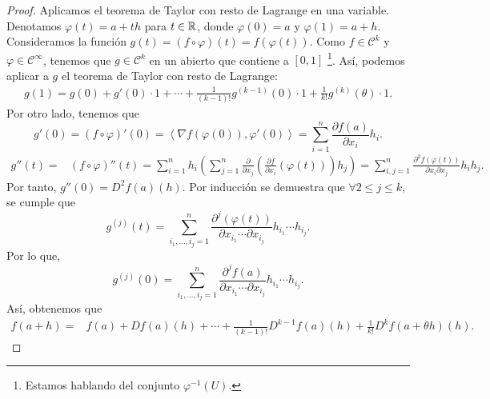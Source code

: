 \begin{proof}
Aplicamos el teorema de Taylor con resto de Lagrange en una variable. Denotamos $\displaystyle \varphi\left(t\right)= a + th $ para $\displaystyle t \in \mathbb{R} $, donde $\displaystyle \varphi\left(0\right) = a $ y $\displaystyle \varphi\left(1\right) = a+h $. Consideramos la función $\displaystyle g\left(t\right)=\left(f\circ \varphi\right)\left(t\right) = f\left(\varphi\left(t\right)\right) $. 
Como $\displaystyle f \in \mathcal{C}^{k} $ y $\displaystyle \varphi \in \mathcal{C}^{\infty} $, tenemos que $\displaystyle g \in \mathcal{C}^{k} $ en un abierto que contiene a $\displaystyle \left[0,1\right]  $ \footnote{Estamos hablando del conjunto $\displaystyle \varphi^{-1}\left(U\right) $.}. Así, podemos aplicar a $\displaystyle g $ el teorema de Taylor con resto de Lagrange:
\[
\begin{split}
	g\left(1\right) = g\left(0\right) + g'\left(0\right) \cdot 1 + \cdots + \frac{1}{\left(k-1\right)!}g^{ \left(k-1\right)}\left(0\right) \cdot 1 + \frac{1}{k!}g^{\left(k\right)}\left(\theta \right) \cdot 1.
\end{split}
\]
Por otro lado, tenemos que
\[g'\left(0\right) = \left(f\circ\varphi\right)'\left(0\right) = \left\langle \nabla f\left(\varphi\left(0\right)\right), \varphi'\left(0\right) \right\rangle = \sum^{n}_{i = 1}\frac{\partial f\left(a\right)}{\partial x_{i}}h_{i} .\]
\[
\begin{split}
	g''\left(t\right)= & \left(f\circ\varphi\right)''\left(t\right) = \sum^{n}_{i = 1}h_{i}\left(\sum^{n}_{j = 1}\frac{\partial }{\partial x_{j}}\left(\frac{\partial f}{\partial x_{i}}\left(\varphi\left(t\right)\right)\right)h_{j}\right) = \sum^{n}_{i,j = 1}\frac{\partial ^{2}f\left(\varphi\left(t\right)\right)}{\partial x_{i}\partial x_{j}}h_{i}h_{j}.
\end{split}
\]
Por tanto, $\displaystyle g''\left(0\right) = D^{2}f\left(a\right)\left(h\right) $. Por inducción se demuestra que $\displaystyle \forall 2 \leq j \leq k $, se cumple que 
\[g^{\left(j\right)}\left(t\right) = \sum^{n}_{i_{1}, \ldots, i_{j} = 1}\frac{\partial^{j}\left(\varphi\left(t\right)\right)}{\partial x_{i_{1}} \cdots \partial x_{i_{j}}}h_{i_{1}} \cdots h_{i_{j}} .\]
Por lo que, 
\[g^{\left(j\right)}\left(0\right) = \sum^{n}_{i_{1}, \ldots, i_{j} = 1}\frac{\partial ^{j}f\left(a\right)}{\partial x_{i_{1}} \cdots \partial x_{i_{j}}}h_{i_{1}} \cdots h_{i_{j}} .\]
Así, obtenemos que  
\[
\begin{split}
	f\left(a+h\right) = & f\left(a\right) + Df\left(a\right)\left(h\right) + \cdots + \frac{1}{\left(k-1\right)!}D^{k-1}f\left(a\right)\left(h\right)+\frac{1}{k!}D^{k}f\left(a+\theta h\right)\left(h\right) .
\end{split}
\]
\end{proof}
